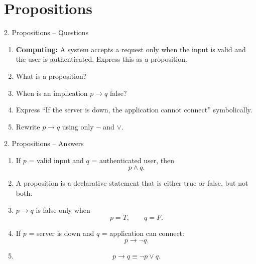 \documentclass[aspectratio=169,11pt]{beamer}
\begin{document}

\section{Propositions}

\begin{frame}{2. Propositions -- Questions}

\begin{enumerate}
\item \textbf{Computing:} A system accepts a request only when the input is valid and the user is authenticated. Express this as a proposition.

\item What is a proposition?

\item When is an implication $p\to q$ false?

\item Express ``If the server is down, the application cannot connect'' symbolically.

\item Rewrite $p\to q$ using only $\neg$ and $\lor$.
\end{enumerate}

\end{frame}

\begin{frame}{2. Propositions -- Answers}

\begin{enumerate}
\item If $p$ = valid input and $q$ = authenticated user, then
\[
p\land q.
\]

\item A proposition is a declarative statement that is either true or false, but not both.

\item $p\to q$ is false only when
\[
p=T,\qquad q=F.
\]

\item If $p$ = server is down and $q$ = application can connect:
\[
p\to\neg q.
\]

\item
\[
p\to q\equiv\neg p\lor q.
\]
\end{enumerate}

\end{frame}

\end{document}
